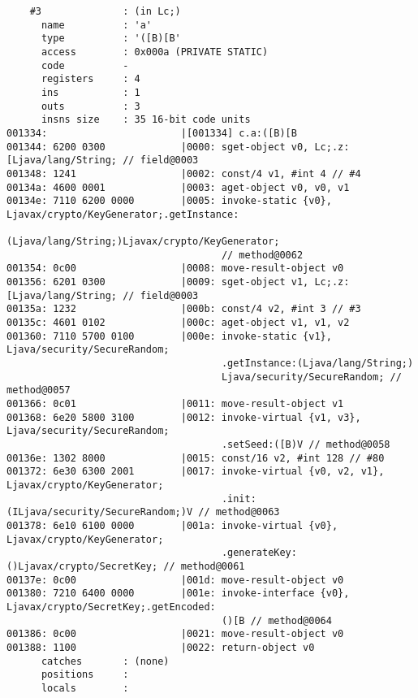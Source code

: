 \begin{lstlisting}
    #3              : (in Lc;)
      name          : 'a'
      type          : '([B)[B'
      access        : 0x000a (PRIVATE STATIC)
      code          -
      registers     : 4
      ins           : 1
      outs          : 3
      insns size    : 35 16-bit code units
001334:                       |[001334] c.a:([B)[B
001344: 6200 0300             |0000: sget-object v0, Lc;.z:[Ljava/lang/String; // field@0003
001348: 1241                  |0002: const/4 v1, #int 4 // #4
00134a: 4600 0001             |0003: aget-object v0, v0, v1
00134e: 7110 6200 0000        |0005: invoke-static {v0}, Ljavax/crypto/KeyGenerator;.getInstance:
                                     (Ljava/lang/String;)Ljavax/crypto/KeyGenerator;
                                     // method@0062
001354: 0c00                  |0008: move-result-object v0
001356: 6201 0300             |0009: sget-object v1, Lc;.z:[Ljava/lang/String; // field@0003
00135a: 1232                  |000b: const/4 v2, #int 3 // #3
00135c: 4601 0102             |000c: aget-object v1, v1, v2
001360: 7110 5700 0100        |000e: invoke-static {v1}, Ljava/security/SecureRandom;
                                     .getInstance:(Ljava/lang/String;)
                                     Ljava/security/SecureRandom; // method@0057
001366: 0c01                  |0011: move-result-object v1
001368: 6e20 5800 3100        |0012: invoke-virtual {v1, v3}, Ljava/security/SecureRandom;
                                     .setSeed:([B)V // method@0058
00136e: 1302 8000             |0015: const/16 v2, #int 128 // #80
001372: 6e30 6300 2001        |0017: invoke-virtual {v0, v2, v1}, Ljavax/crypto/KeyGenerator;
                                     .init:(ILjava/security/SecureRandom;)V // method@0063
001378: 6e10 6100 0000        |001a: invoke-virtual {v0}, Ljavax/crypto/KeyGenerator;
                                     .generateKey:()Ljavax/crypto/SecretKey; // method@0061
00137e: 0c00                  |001d: move-result-object v0
001380: 7210 6400 0000        |001e: invoke-interface {v0}, Ljavax/crypto/SecretKey;.getEncoded:
                                     ()[B // method@0064
001386: 0c00                  |0021: move-result-object v0
001388: 1100                  |0022: return-object v0
      catches       : (none)
      positions     :
      locals        :


\end{lstlisting}
